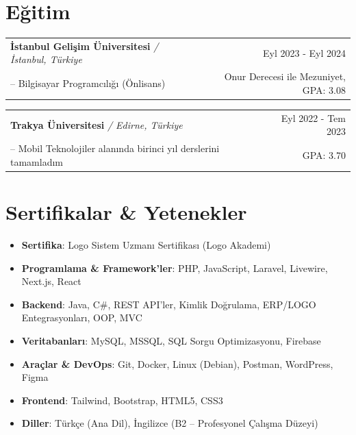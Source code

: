 \documentclass[a4paper,12pt]{article}
\makeatletter
\newenvironment{educationshort}[5]
    {
    \begin{tabularx}{\linewidth}{@{}l X r@{}}
    \textbf{#1} {\small\textit{/ #2}} & \hfill & #3 \\[3.5pt]
    -- #4 & \hfill & #5 \\[3pt]
    \end{tabularx}
    }
    {
    }
\makeatother
\begin{document}
\section{Eğitim}

\begin{educationshort}
{İstanbul Gelişim Üniversitesi}{İstanbul, Türkiye}{Eyl 2023 - Eyl 2024}
{Bilgisayar Programcılığı (Önlisans)}{Onur Derecesi ile Mezuniyet, GPA: 3.08}
\end{educationshort}

\begin{educationshort}
{Trakya Üniversitesi}{Edirne, Türkiye}{Eyl 2022 - Tem 2023}
{Mobil Teknolojiler alanında birinci yıl derslerini tamamladım}{GPA: 3.70}
\end{educationshort}
\vspace{-8pt}

\section{Sertifikalar \& Yetenekler}

\begin{itemize}[nosep,after=\strut, leftmargin=1em, itemsep=2.5pt,label=\textbullet]
    \item \textbf{Sertifika}: Logo Sistem Uzmanı Sertifikası (Logo Akademi)
    \item \textbf{Programlama \& Framework'ler}: PHP, JavaScript, Laravel, Livewire, Next.js, React
    \item \textbf{Backend}: Java, C\#, REST API'ler, Kimlik Doğrulama, ERP/LOGO Entegrasyonları, OOP, MVC
    \item \textbf{Veritabanları}: MySQL, MSSQL, SQL Sorgu Optimizasyonu, Firebase
    \item \textbf{Araçlar \& DevOps}: Git, Docker, Linux (Debian), Postman, WordPress, Figma
    \item \textbf{Frontend}: Tailwind, Bootstrap, HTML5, CSS3
    \item \textbf{Diller}: Türkçe (Ana Dil), İngilizce (B2 – Profesyonel Çalışma Düzeyi)
\end{itemize}

\vfill
\end{document}
